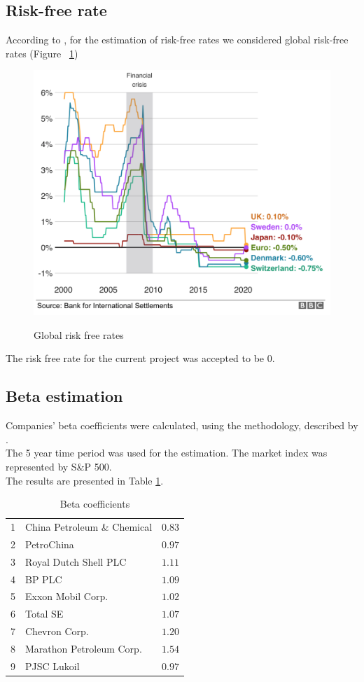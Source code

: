 \documentclass [a4paper, 11pt] {article}
\begin{document}
\clearpage
\subsection {Risk-free rate}

According to \cite{Anderson}, for the estimation of risk-free rates we considered global risk-free rates (Figure ~\ref{fig:rf})

\begin{figure}[!tbp]
\caption{Global risk free rates}
\includegraphics[scale=0.25]{risk_free}
\label{fig:rf}
\end{figure}

The risk free rate for the current project was accepted to be 0.

\clearpage
\subsection {Beta estimation}

Companies' beta coefficients were calculated, using the methodology, described by \cite{Casey}.\\
The 5 year time period was used for the estimation. The market index was represented by S\&P 500.\\
The results are presented in Table \ref{tab:beta}.\\

\begin{table}[!h]
\caption{Beta coefficients\label{beta}} 
\begin{center}
\begin{tabular}{llr}
\hline\hline
1&China Petroleum \& Chemical&$0.83$\tabularnewline
2&PetroChina&$0.97$\tabularnewline
3&Royal Dutch Shell PLC&$1.11$\tabularnewline
4&BP PLC&$1.09$\tabularnewline
5&Exxon Mobil Corp.&$1.02$\tabularnewline
6&Total SE&$1.07$\tabularnewline
7&Chevron Corp.&$1.20$\tabularnewline
8&Marathon Petroleum Corp.&$1.54$\tabularnewline
9&PJSC Lukoil&$0.97$\tabularnewline
\hline
\end{tabular}\end{center}
\label{tab:beta}
\end{table}
\end{document}
